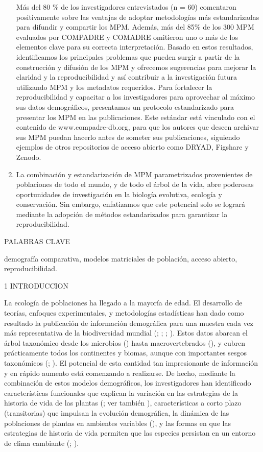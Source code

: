 \documentclass[
]{book}
\theoremstyle{definition}
\theoremstyle{definition}
\theoremstyle{definition}
\theoremstyle{definition}
\theoremstyle{remark}
\begin{document}
\begin{enumerate}
  Más del 80 \% de los investigadores entrevistados (n = 60) comentaron positivamente sobre las ventajas de adoptar metodologías más estandarizadas para difundir y compartir los MPM. Además, más del 85\% de los 300 MPM evaluados por COMPADRE y COMADRE omitieron uno o más de los elementos clave para su correcta interpretación. Basado en estos resultados, identificamos los principales problemas que pueden surgir a partir de la construcción y difusión de los MPM y ofrecemos sugerencias para mejorar la claridad y la reproducibilidad y así contribuir a la investigación futura utilizando MPM y los metadatos requeridos. Para fortalecer la reproducibilidad y capacitar a los investigadores para aprovechar al máximo sus datos demográficos, presentamos un protocolo estandarizado para presentar los MPM en las publicaciones. Este estándar está vinculado con el contenido de www.compadre-db.org, para que los autores que deseen archivar sus MPM puedan hacerlo antes de someter sus publicaciones, siguiendo ejemplos de otros repositorios de acceso abierto como DRYAD, Figshare y Zenodo.
\item
  La combinación y estandarización de MPM parametrizados provenientes de poblaciones de todo el mundo, y de todo el árbol de la vida, abre poderosas oportunidades de investigación en la biología evolutiva, ecología y conservación. Sin embargo, enfatizamos que este potencial solo se logrará mediante la adopción de métodos estandarizados para garantizar la reproducibilidad.
\end{enumerate}

PALABRAS CLAVE

demografía comparativa, modelos matriciales de población, acceso abierto, reproducibilidad.

1 \textbar{} INTRODUCCION

La ecología de poblaciones ha llegado a la mayoría de edad. El desarrollo de teorías, enfoques experimentales, y metodologías estadísticas han dado como resultado la publicación de información demográfica para una muestra cada vez más representativa de la biodiversidad mundial (\citet{de2009database}; \citet{levin2022rpadrino}; \citet{salguero2015compadre}; \citet{salguero2016comadre}). Estos datos abarcan el árbol taxonómico desde los microbios (\citet{jouvet2018demographic}) hasta macrovertebrados (\citet{fujiwara2001demography}), y cubren prácticamente todos los continentes y biomas, aunque con importantes sesgos taxonómicos (\citet{conde2019data}; \citet{romer2023plant}). El potencial de esta cantidad tan impresionante de información y en rápido aumento está comenzando a realizarse. De hecho, mediante la combinación de estos modelos demográficos, los investigadores han identificado características funcionales que explican la variación en las estrategias de la historia de vida de las plantas (\citet{adler2014functional}; ver también \citet{bernard2023mosaic}), características a corto plazo (transitorias) que impulsan la evolución demográfica, la dinámica de las poblaciones de plantas en ambientes variables (\citet{mcdonald2016transients}), y las formas en que las estrategias de historia de vida permiten que las especies persistan en un entorno de clima cambiante (\citet{jelbert2019demographic}; \citet{paniw2019life}).
\end{document}

